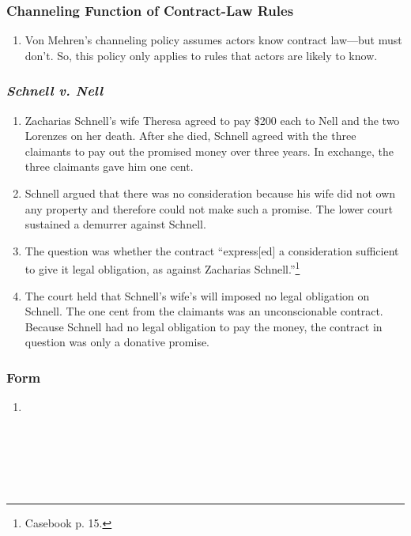\subsubsection{Channeling Function of Contract-Law Rules}

\begin{enumerate}
    \item Von Mehren's channeling policy assumes actors know contract 
    law---but must don't. So, this policy only applies to rules that actors 
    are likely to know. 
\end{enumerate}

\subsubsection{\emph{Schnell v. Nell}}

\begin{enumerate}
    \item Zacharias Schnell's wife Theresa agreed to pay \$200 each to Nell and 
    the two Lorenzes on her death. After she died, Schnell agreed with the 
    three claimants to pay out the promised money over three years. In 
    exchange, the three claimants gave him one cent.
    \item Schnell argued that there was no consideration because his wife did 
    not own any property and therefore could not make such a promise. The 
    lower court sustained a demurrer against Schnell.
    \item The question was whether the contract ``express[ed] a consideration 
    sufficient to give it legal obligation, as against Zacharias 
    Schnell.''\footnote{Casebook p. 15.}
    \item The court held that Schnell's wife's will imposed no legal 
    obligation on Schnell. The one cent from the claimants was an 
    unconscionable contract. Because Schnell had no legal obligation to pay 
    the money, the contract in question was only a donative promise.
\end{enumerate}

\subsubsection{Form}

\begin{enumerate}
    \item %
    ~\\\\\\\\\\\\
\end{enumerate}

